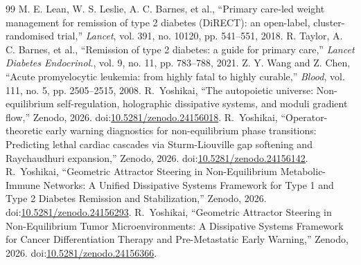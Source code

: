 \documentclass[11pt,a4paper]{article}
\begin{document}
\begin{thebibliography}{99}
 M. E. Lean, W. S. Leslie, A. C. Barnes, et al., ``Primary care-led weight management for remission of type 2 diabetes (DiRECT): an open-label, cluster-randomised trial,'' \textit{Lancet}, vol. 391, no. 10120, pp. 541--551, 2018.
 R. Taylor, A. C. Barnes, et al., ``Remission of type 2 diabetes: a guide for primary care,'' \textit{Lancet Diabetes Endocrinol.}, vol. 9, no. 11, pp. 783--788, 2021.
 Z. Y. Wang and Z. Chen, ``Acute promyelocytic leukemia: from highly fatal to highly curable,'' \textit{Blood}, vol. 111, no. 5, pp. 2505--2515, 2008.
 R.~Yoshikai, ``The autopoietic universe: Non-equilibrium self-regulation, holographic dissipative systems, and moduli gradient flow,'' Zenodo, 2026. doi:\href{https://doi.org/10.5281/zenodo.24156018}{10.5281/zenodo.24156018}.
 R.~Yoshikai, ``Operator-theoretic early warning diagnostics for non-equilibrium phase transitions: Predicting lethal cardiac cascades via Sturm-Liouville gap softening and Raychaudhuri expansion,'' Zenodo, 2026. doi:\href{https://doi.org/10.5281/zenodo.24156142}{10.5281/zenodo.24156142}.
 R.~Yoshikai, ``Geometric Attractor Steering in Non-Equilibrium Metabolic-Immune Networks: A Unified Dissipative Systems Framework for Type 1 and Type 2 Diabetes Remission and Stabilization,'' Zenodo, 2026. doi:\href{https://doi.org/10.5281/zenodo.24156293}{10.5281/zenodo.24156293}.
 R.~Yoshikai, ``Geometric Attractor Steering in Non-Equilibrium Tumor Microenvironments: A Dissipative Systems Framework for Cancer Differentiation Therapy and Pre-Metastatic Early Warning,'' Zenodo, 2026. doi:\href{https://doi.org/10.5281/zenodo.24156366}{10.5281/zenodo.24156366}.
\end{thebibliography}
\end{document}
